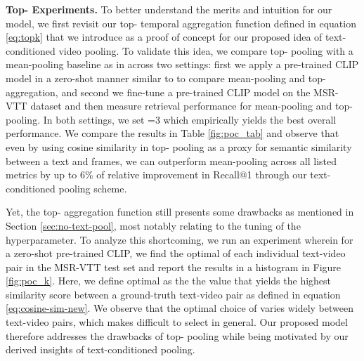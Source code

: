 \documentclass[10pt,twocolumn,letterpaper]{article}
\begin{document}
\textbf{Top- Experiments.}
To better understand the merits and intuition for our \ModelName{} model, we first revisit our top- temporal aggregation function defined in equation \eqref{eq:topk} that we introduce as a proof of concept for our proposed idea of text-conditioned video pooling. To validate this idea, we compare top- pooling with a mean-pooling baseline as in \cite{portillo2021straightforward, luo2021clip4clip} across two settings: first we apply a pre-trained CLIP model in a zero-shot manner similar to \cite{portillo2021straightforward} to compare mean-pooling and top- aggregation, and second we fine-tune a pre-trained CLIP model on the MSR-VTT dataset and then measure retrieval performance for mean-pooling and top- pooling. In both settings, we set =3 which empirically yields the best overall performance. We compare the  results in Table \ref{fig:poc_tab} and observe that even by using cosine similarity in top- pooling as a proxy for semantic similarity between a text and frames, we can outperform mean-pooling across all listed metrics by up to 6\% of relative improvement in Recall@1 through our text-conditioned pooling scheme. 

Yet, the top- aggregation function still presents some drawbacks as mentioned in Section \ref{sec:no-text-pool}, most notably relating to the tuning of the  hyperparameter. To analyze this shortcoming, we run an experiment wherein for a zero-shot pre-trained CLIP, we find the optimal  of each individual text-video pair in the MSR-VTT test set and report the results in a histogram in Figure \ref{fig:poc_k}. Here, we define optimal as the the  value that yields the highest similarity score between a ground-truth text-video pair as defined in equation \eqref{eq:cosine-sim-new}. We observe that the optimal choice of  varies widely between text-video pairs, which makes  difficult to select in general. Our proposed \ModelName{} model therefore addresses the drawbacks of top- pooling while being motivated by our derived insights of text-conditioned pooling.   
\end{document}
